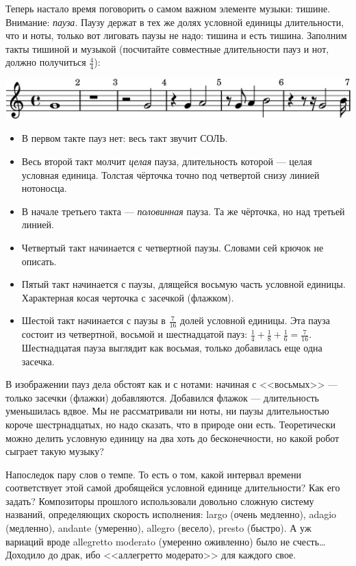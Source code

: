 Теперь настало время поговорить о самом важном элементе музыки: тишине. Внимание: \emph{пауза}. Паузу держат в тех же долях условной единицы длительности, что и ноты, только вот лиговать паузы не надо: тишина и есть тишина. Заполним такты тишиной и музыкой (посчитайте совместные длительности пауз и нот, должно получиться $\frac{4}{4}$): 
\begin{center}
    \includegraphics{fig/notes/pause}
\end{center}
\begin{itemize}
    \item В первом такте пауз нет: весь такт звучит СОЛЬ.
    \item Весь второй такт молчит \emph{целая} пауза, длительность которой --- целая условная единица. Толстая чёрточка точно под четвертой снизу линией нотоносца.
    \item В начале третьего такта --- \emph{половинная} пауза. Та же чёрточка, но над третьей линией.
    \item Четвертый такт начинается с четвертной паузы. Словами сей крючок не описать.
    \item Пятый такт начинается с паузы, длящейся восьмую часть условной единицы. Характерная косая черточка с засечкой (флажком).
    \item Шестой такт начинается с паузы в $\frac{7}{16}$ долей условной единицы. Эта пауза состоит из четвертной, восьмой и шестнадцатой пауз: $\frac{1}{4} + \frac{1}{8} + \frac{1}{6} = \frac{7}{16}$. Шестнадцатая пауза выглядит как восьмая, только добавилась еще одна засечка. 
\end{itemize}

В изображении пауз дела обстоят как и с нотами: начиная с <<восьмых>> --- только засечки (флажки) добавляются. Добавился флажок --- длительность уменьшилась вдвое. Мы не рассматривали ни ноты, ни паузы длительностью короче шестрнадцатых, но надо сказать, что в природе они есть. Теоретически можно делить условную единицу на два хоть до бесконечности, но какой робот сыграет такую музыку?

Напоследок пару слов о темпе. То есть о том, какой интервал времени соответствует этой самой дробящейся условной единице длительности? Как его задать? Композиторы прошлого использовали довольно сложную систему названий, определяющих скорость исполнения: largo (очень медленно), adagio (медленно), andante (умеренно), allegro (весело), presto (быстро). А уж вариаций вроде allegretto moderato (умеренно оживленно) было не счесть\ldots Доходило до драк, ибо <<аллегретто модерато>> для каждого свое. 

